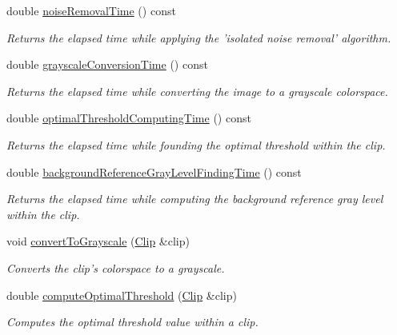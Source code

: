 \begin{CompactItemize}
double \hyperlink{class_preprocessor_0cccd23820430541f18f2b24dbfd0784}{noiseRemovalTime} () const 
\begin{CompactList}\small\item\em Returns the elapsed time while applying the 'isolated noise removal' algorithm. \item\end{CompactList}\item 
double \hyperlink{class_preprocessor_7afe140bf2697393170fb8e2ccb818d5}{grayscaleConversionTime} () const 
\begin{CompactList}\small\item\em Returns the elapsed time while converting the image to a grayscale colorspace. \item\end{CompactList}\item 
double \hyperlink{class_preprocessor_72dd29238c4202698e67dcb26a47f4b5}{optimalThresholdComputingTime} () const 
\begin{CompactList}\small\item\em Returns the elapsed time while founding the optimal threshold within the clip. \item\end{CompactList}\item 
double \hyperlink{class_preprocessor_3189cad5515476d54cc14effcf983fc7}{backgroundReferenceGrayLevelFindingTime} () const 
\begin{CompactList}\small\item\em Returns the elapsed time while computing the background reference gray level within the clip. \item\end{CompactList}\item 
void \hyperlink{class_preprocessor_c9a0935f5eac55d15aa632fcce9b478e}{convertToGrayscale} (\hyperlink{class_clip}{Clip} \&clip)
\begin{CompactList}\small\item\em Converts the clip's colorspace to a grayscale. \item\end{CompactList}\item 
double \hyperlink{class_preprocessor_84fcd2ccbbecea37f4bcdae5d7547ecd}{computeOptimalThreshold} (\hyperlink{class_clip}{Clip} \&clip)
\begin{CompactList}\small\item\em Computes the optimal threshold value within a clip. \item\end{CompactList}\item 

\end{CompactItemize}
